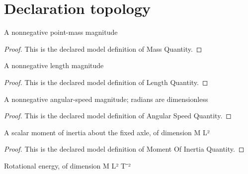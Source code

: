 \section{Declaration topology}
\begin{definition}
  \label{def:physics:phyx-mini-0698:phyxminiproblems-problemphyxmini0698-massquantity}
  A nonnegative point-mass magnitude
\end{definition}
\begin{proof}
  This is the declared model definition of Mass Quantity.
\end{proof}
\begin{definition}
  \label{def:physics:phyx-mini-0698:phyxminiproblems-problemphyxmini0698-lengthquantity}
  A nonnegative length magnitude
\end{definition}
\begin{proof}
  This is the declared model definition of Length Quantity.
\end{proof}
\begin{definition}
  \label{def:physics:phyx-mini-0698:phyxminiproblems-problemphyxmini0698-angularspeedquantity}
  A nonnegative angular-speed magnitude; radians are dimensionless
\end{definition}
\begin{proof}
  This is the declared model definition of Angular Speed Quantity.
\end{proof}
\begin{definition}
  \label{def:physics:phyx-mini-0698:phyxminiproblems-problemphyxmini0698-momentofinertiaquantity}
  A scalar moment of inertia about the fixed axle, of dimension M L²
\end{definition}
\begin{proof}
  This is the declared model definition of Moment Of Inertia Quantity.
\end{proof}
\begin{definition}
  \label{def:physics:phyx-mini-0698:phyxminiproblems-problemphyxmini0698-energyquantity}
  Rotational energy, of dimension M L² T⁻²
\end{definition}
